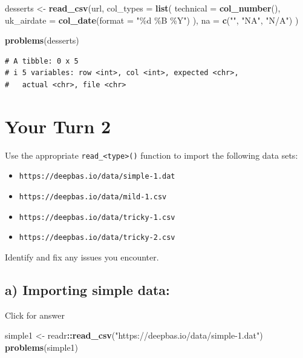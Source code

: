 \documentclass[
]{book}
\newenvironment{Shaded}{\begin{snugshade}}{\end{snugshade}}
\newcommand{\AttributeTok}[1]{\textcolor[rgb]{0.13,0.29,0.53}{#1}}
\newcommand{\FunctionTok}[1]{\textcolor[rgb]{0.13,0.29,0.53}{\textbf{#1}}}
\newcommand{\NormalTok}[1]{#1}
\newcommand{\OtherTok}[1]{\textcolor[rgb]{0.56,0.35,0.01}{#1}}
\newcommand{\SpecialCharTok}[1]{\textcolor[rgb]{0.81,0.36,0.00}{\textbf{#1}}}
\newcommand{\StringTok}[1]{\textcolor[rgb]{0.31,0.60,0.02}{#1}}
\begin{document}
\begin{Shaded}
\begin{Highlighting}[]
\NormalTok{desserts }\OtherTok{\textless{}{-}} \FunctionTok{read\_csv}\NormalTok{(url,}
  \AttributeTok{col\_types =} \FunctionTok{list}\NormalTok{(}
    \AttributeTok{technical =} \FunctionTok{col\_number}\NormalTok{(), }
    \AttributeTok{uk\_airdate =} \FunctionTok{col\_date}\NormalTok{(}\AttributeTok{format =} \StringTok{"\%d \%B \%Y"}\NormalTok{)}
\NormalTok{  ),}
  \AttributeTok{na =} \FunctionTok{c}\NormalTok{(}\StringTok{""}\NormalTok{, }\StringTok{"NA"}\NormalTok{, }\StringTok{"N/A"}\NormalTok{)}
\NormalTok{)}

\FunctionTok{problems}\NormalTok{(desserts)}
\end{Highlighting}
\end{Shaded}

\begin{verbatim}
# A tibble: 0 x 5
# i 5 variables: row <int>, col <int>, expected <chr>,
#   actual <chr>, file <chr>
\end{verbatim}

\hypertarget{your-turn-2-1}{%
\section{Your Turn 2}\label{your-turn-2-1}}

Use the appropriate \texttt{read\_\textless{}type\textgreater{}()} function to import the following data sets:

\begin{itemize}
\item
  \texttt{https://deepbas.io/data/simple-1.dat}
\item
  \texttt{https://deepbas.io/data/mild-1.csv}
\item
  \texttt{https://deepbas.io/data/tricky-1.csv}
\item
  \texttt{https://deepbas.io/data/tricky-2.csv}
\end{itemize}

Identify and fix any issues you encounter.

\hypertarget{a-importing-simple-data}{%
\subsection{a) Importing simple data:}\label{a-importing-simple-data}}

Click for answer

\begin{Shaded}
\begin{Highlighting}[]
\NormalTok{simple1 }\OtherTok{\textless{}{-}}\NormalTok{ readr}\SpecialCharTok{::}\FunctionTok{read\_csv}\NormalTok{(}\StringTok{"https://deepbas.io/data/simple{-}1.dat"}\NormalTok{)}
\FunctionTok{problems}\NormalTok{(simple1)}
\end{Highlighting}
\end{Shaded}
\end{document}
